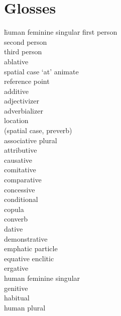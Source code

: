 
\section*{Glosses}
	\begin{multicols}{2}
    \largerpage[2]
		\begin{tabbing}
            \hspace{\tabcolsep}\= human feminine singular\kill
				\>	first person\\
				\>	second person\\
				\>	third person\\
				\>	ablative\\
			 	\>	spatial case `at' animate \\
			{}		\> reference point\\
				\>	additive\\
				\>	adjectivizer\\
				\>	adverbializer\\
				\>	location \\
			{}		\>	(spatial case, preverb)\\
				\>	associative plural\\
				\>	attributive\\
				\>	causative\\
				\>	comitative\\
				\>	comparative\\
				\>	concessive\\
				\>	conditional\\
				\>	copula\\
				\>	converb\\
				\>	dative\\
				\>	demonstrative\\
				\>	emphatic particle\\
				\>	equative enclitic\\
				\>	ergative\\
				\>	human feminine singular\\
				\>	genitive\\
				\>	habitual\\
				\>	human plural\\

\end{tabbing}
\end{multicols}

